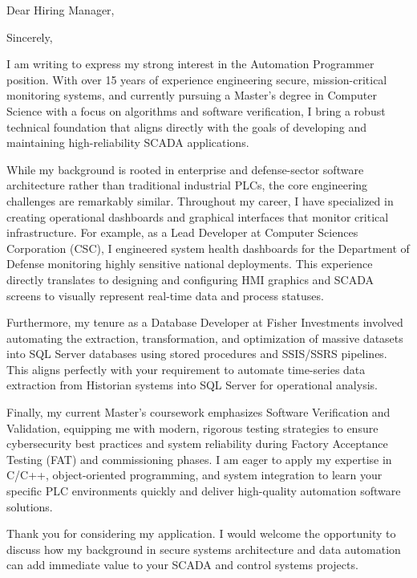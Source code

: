 \documentclass[11pt,a4paper,sans]{moderncv}
\begin{document}
\date{\today}
\opening{Dear Hiring Manager,}
\closing{Sincerely,}

\makelettertitle

I am writing to express my strong interest in the Automation Programmer position. With over 15 years of experience engineering secure, mission-critical monitoring systems, and currently pursuing a Master's degree in Computer Science with a focus on algorithms and software verification, I bring a robust technical foundation that aligns directly with the goals of developing and maintaining high-reliability SCADA applications.

While my background is rooted in enterprise and defense-sector software architecture rather than traditional industrial PLCs, the core engineering challenges are remarkably similar. Throughout my career, I have specialized in creating operational dashboards and graphical interfaces that monitor critical infrastructure. For example, as a Lead Developer at Computer Sciences Corporation (CSC), I engineered system health dashboards for the Department of Defense monitoring highly sensitive national deployments. This experience directly translates to designing and configuring HMI graphics and SCADA screens to visually represent real-time data and process statuses.

Furthermore, my tenure as a Database Developer at Fisher Investments involved automating the extraction, transformation, and optimization of massive datasets into SQL Server databases using stored procedures and SSIS/SSRS pipelines. This aligns perfectly with your requirement to automate time-series data extraction from Historian systems into SQL Server for operational analysis. 

Finally, my current Master's coursework emphasizes Software Verification and Validation, equipping me with modern, rigorous testing strategies to ensure cybersecurity best practices and system reliability during Factory Acceptance Testing (FAT) and commissioning phases. I am eager to apply my expertise in C/C++, object-oriented programming, and system integration to learn your specific PLC environments quickly and deliver high-quality automation software solutions.

Thank you for considering my application. I would welcome the opportunity to discuss how my background in secure systems architecture and data automation can add immediate value to your SCADA and control systems projects.

\makeletterclosing
\end{document}
